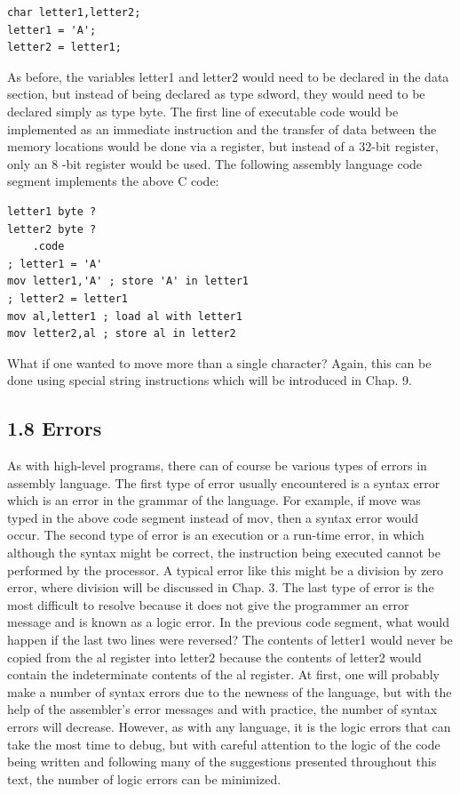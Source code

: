 \documentclass[10pt]{article}
\begin{document}
\begin{verbatim}
char letter1,letter2;
letter1 = 'A';
letter2 = letter1;
\end{verbatim}

As before, the variables letter1 and letter2 would need to be declared in the data section, but instead of being declared as type sdword, they would need to be declared simply as type byte. The first line of executable code would be implemented as an immediate instruction and the transfer of data between the memory locations would be done via a register, but instead of a 32-bit register, only an 8 -bit register would be used. The following assembly language code segment implements the above C code:

\begin{verbatim}
letter1 byte ?
letter2 byte ?
    .code
; letter1 = 'A'
mov letter1,'A' ; store 'A' in letter1
; letter2 = letter1
mov al,letter1 ; load al with letter1
mov letter2,al ; store al in letter2
\end{verbatim}

What if one wanted to move more than a single character? Again, this can be done using special string instructions which will be introduced in Chap. 9.

\subsection*{1.8 Errors}
As with high-level programs, there can of course be various types of errors in assembly language. The first type of error usually encountered is a syntax error which is an error in the grammar of the language. For example, if move was typed in the above code segment instead of mov, then a syntax error would occur. The second type of error is an execution or a run-time error, in which although the syntax might be correct, the instruction being executed cannot be performed by the processor. A typical error like this might be a division by zero error, where division will be discussed in Chap. 3. The last type of error is the most difficult to resolve because it does not give the programmer an error message and is known as a logic error. In the previous code segment, what would happen if the last two lines were reversed? The contents of letter1 would never be copied from the al register into letter2 because the contents of letter2 would contain the indeterminate contents of the al register. At first, one will probably make a number of syntax errors due to the newness of the language, but with the help of the assembler's error messages and with practice, the number of syntax errors will decrease. However, as with any language, it is the logic errors that can take the most time to debug, but with careful attention to the logic of the code being written and following many of the suggestions presented throughout this text, the number of logic errors can be minimized.
\end{document}
